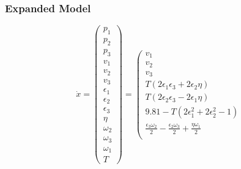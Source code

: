 \documentclass{beamer}
\begin{document}


\begin{frame}
    \frametitle{Expanded Model}
    \begin{equation}
        \dot{x}=\left(\begin{array}{c}
                p_{1}        \\
                p_{2}        \\
                p_{3}        \\
                v_{1}        \\
                v_{2}        \\
                v_{3}        \\
                \epsilon_{1} \\
                \epsilon_{2} \\
                \epsilon_{3} \\
                \eta         \\
                \omega_{2}   \\
                \omega_{3}   \\
                \omega_{1}   \\
                T
            \end{array}\right)=\left(\begin{array}{c}
                v_{1}                                                                                                  \\
                v_{2}                                                                                                  \\
                v_{3}                                                                                                  \\
                T\left(2 \epsilon_{1} \epsilon_{3}+2 \epsilon_{2} \eta\right)                                          \\
                T\left(2 \epsilon_{2} \epsilon_{3}-2 \epsilon_{1} \eta\right)                                          \\
                9.81-T\left(2 \epsilon_{1}^{2}+2 \epsilon_{2}^{2}-1\right)                                             \\
                \frac{\epsilon_{3} \omega_{2}}{2}-\frac{\epsilon_{2} \omega_{3}}{2}+\frac{\eta \omega_{1}}{2}          \\

\end{array}
\end{equation}
\end{frame}
\end{document}
